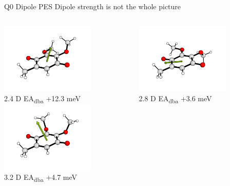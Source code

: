 \documentclass[9pt,t,xcolor=table]{beamer}
\begin{document}
\begin{frame}{\huge Q0 Dipole PES}\large
	Dipole strength is not the whole picture
	\begin{columns}
		\begin{column}{0.5\textwidth}
			\centering
			\includegraphics[width=0.7\textwidth]{Figs/Q0_181.png} \\
			{\textmu} 2.4 D EA\textsubscript{dba} +12.3 meV \\
			
			\includegraphics[width=0.7\textwidth]{Figs/Q0_90.png} \\
			{\textmu} 3.2 D EA\textsubscript{dba} +4.7 meV
		\end{column}
		\begin{column}{0.5\textwidth}
			\centering
			\includegraphics[width=0.7\textwidth]{Figs/Q0_6.png} \\
			{\textmu} 2.8 D EA\textsubscript{dba} +3.6 meV \\
			

\end{column}
\end{columns}
\end{frame}
\end{document}
